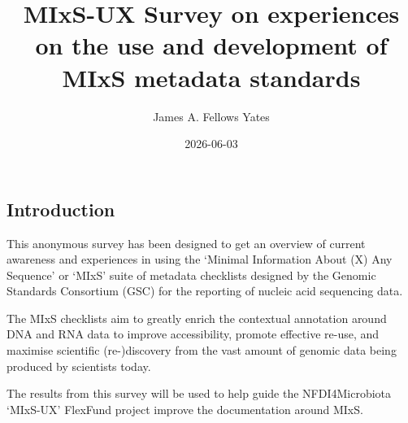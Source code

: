 \documentclass[
  letterpaper,
  DIV=11,
  numbers=noendperiod]{scrartcl}
\title{MIxS-UX Survey on experiences on the use and development of MIxS
metadata standards}
\author{James A. Fellows Yates}
\date{2026-06-03}
\renewcommand*\contentsname{Table of contents}
\newcommand\contentsname{Table of contents}
\begin{document}
\maketitle

\renewcommand*\contentsname{Table of contents}
{
\setcounter{tocdepth}{3}
\tableofcontents
}

\subsection{Introduction}\label{introduction}

This anonymous survey has been designed to get an overview of current
awareness and experiences in using the `Minimal Information About (X)
Any Sequence' or `MIxS' suite of metadata checklists designed by the
Genomic Standards Consortium (GSC) for the reporting of nucleic acid
sequencing data.

The MIxS checklists aim to greatly enrich the contextual annotation
around DNA and RNA data to improve accessibility, promote effective
re-use, and maximise scientific (re-)discovery from the vast amount of
genomic data being produced by scientists today.

The results from this survey will be used to help guide the
NFDI4Microbiota `MIxS-UX' FlexFund project improve the documentation
around MIxS.
\end{document}
